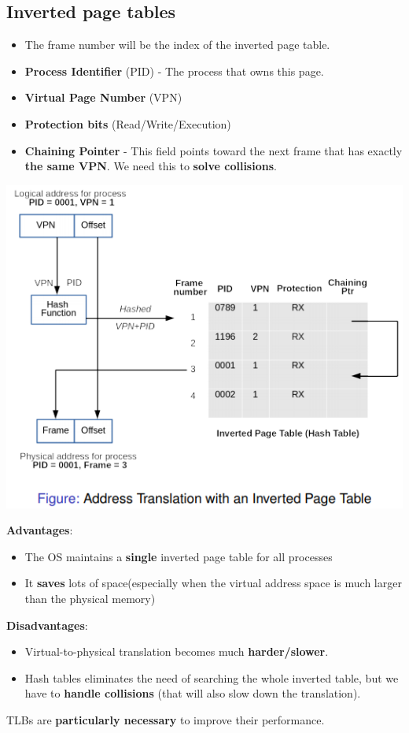 \documentclass{article}
\begin{document}
\subsection{Inverted page tables}
\begin{itemize}
	\item The frame number will be the index of the inverted page table.
	\item \textbf{Process Identifier} (PID) - The process that owns this page.
	\item \textbf{Virtual Page Number} (VPN)
	\item \textbf{Protection bits} (Read/Write/Execution)
	\item \textbf{Chaining Pointer} - This field points toward the next frame that has exactly \textbf{the same VPN}. We need this to \textbf{solve collisions}.
\end{itemize}
\begin{center}
	\includegraphics[scale=0.6]{inverted_table.png}
\end{center}

\bigskip
\begin{flushleft}
\textbf{Advantages}:
\begin{itemize}
	\item The OS maintains a \textbf{single} inverted page table for all processes
	\item It \textbf{saves} lots of space(especially when the virtual address space is much larger than the physical memory) 
\end{itemize}
\textbf{Disadvantages}:
\begin{itemize}
	\item Virtual-to-physical translation becomes much \textbf{harder/slower}.
	\item Hash tables eliminates the need of searching the whole inverted table, but we have to \textbf{handle collisions} (that will also slow down the translation).
\end{itemize}
TLBs are \textbf{particularly necessary} to improve their performance.
\end{flushleft}
\end{document}
